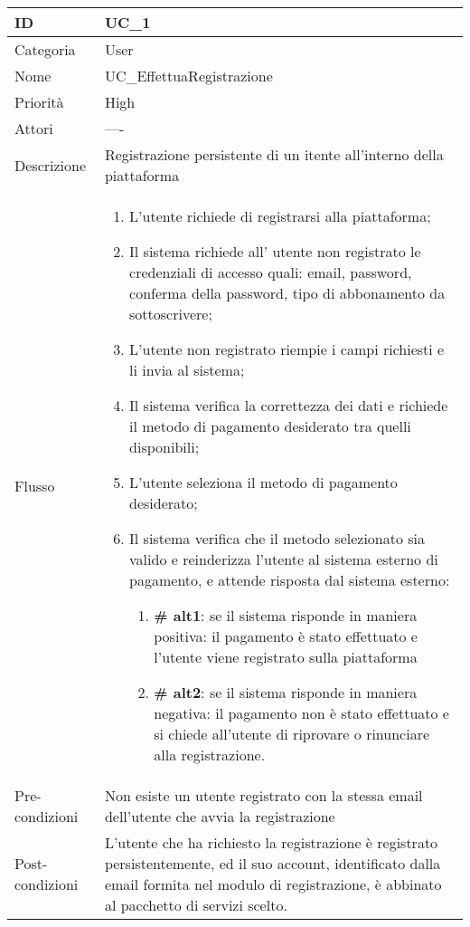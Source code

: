 \begin{center}
\begin{tabular}{ |p{2cm}|p{13cm}|  }
\hline
ID & UC\_1 \\\hline
Categoria & User \\\hline
Nome & UC\_EffettuaRegistrazione \\\hline
Priorità & High \\\hline
Attori &  ---- \\\hline
Descrizione & Registrazione persistente di un itente all'interno della piattaforma \\\hline
Flusso &  	\begin{enumerate}
			\item L'utente richiede di registrarsi alla piattaforma;
			\item Il sistema richiede all' utente non registrato le credenziali di accesso quali: email, password, conferma della password, tipo di abbonamento da sottoscrivere;
			\item L'utente non registrato riempie i campi richiesti e li invia al sistema;
			\item Il sistema verifica la correttezza dei dati e richiede il metodo di pagamento desiderato tra quelli disponibili;
			\item L'utente seleziona il metodo di pagamento desiderato;
			\item Il sistema verifica che il metodo selezionato sia valido e reinderizza l'utente al sistema esterno di pagamento, e attende risposta dal sistema esterno:
			\begin{enumerate}[  ]
				\item \textbf{\# alt1}: se il sistema risponde in maniera positiva: il pagamento è stato effettuato e l'utente viene registrato sulla piattaforma 
				\item \textbf{\# alt2}: se il sistema risponde in maniera negativa: il pagamento non è stato effettuato e si chiede all'utente di riprovare o rinunciare alla registrazione.
			\end{enumerate}
		\end{enumerate}\\\hline
Pre-condizioni &  Non esiste un utente registrato con la stessa email dell'utente che avvia la registrazione\\\hline
Post-condizioni &  L'utente che ha richiesto la registrazione è registrato persistentemente, ed il suo account, identificato dalla email formita nel modulo di registrazione, è abbinato al pacchetto di servizi scelto.\\\hline
\end{tabular}
\label{table_use_case:1}\newline


\end{center}
